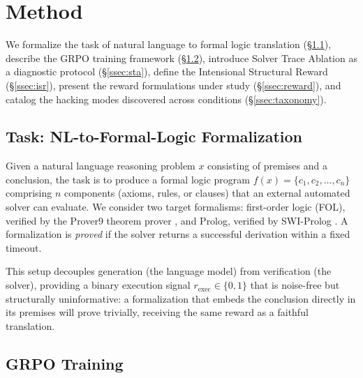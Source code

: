
\section{Method}
\label{sec:method}

We formalize the task of natural language to formal logic translation (\S\ref{ssec:task}), describe the GRPO training framework (\S\ref{ssec:grpo}), introduce Solver Trace Ablation as a diagnostic protocol (\S\ref{ssec:sta}), define the Intensional Structural Reward (\S\ref{ssec:isr}), present the reward formulations under study (\S\ref{ssec:reward}), and catalog the hacking modes discovered across conditions (\S\ref{ssec:taxonomy}).

\subsection{Task: NL-to-Formal-Logic Formalization}
\label{ssec:task}

Given a natural language reasoning problem $x$ consisting of premises and a conclusion, the task is to produce a formal logic program $f(x) = \{c_1, c_2, \ldots, c_n\}$ comprising $n$ components (axioms, rules, or clauses) that an external automated solver can evaluate. We consider two target formalisms: first-order logic (FOL), verified by the Prover9 theorem prover \cite{mccune2005prover9}, and Prolog, verified by SWI-Prolog \cite{wielemaker2012swi}. A formalization is \emph{proved} if the solver returns a successful derivation within a fixed timeout.

This setup decouples generation (the language model) from verification (the solver), providing a binary execution signal $r_{\text{exec}} \in \{0, 1\}$ that is noise-free but structurally uninformative: a formalization that embeds the conclusion directly in its premises will prove trivially, receiving the same reward as a faithful translation.

\subsection{GRPO Training}
\label{ssec:grpo}

